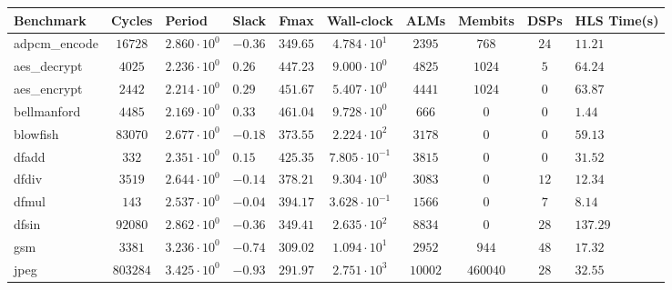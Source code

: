 \begin{tabular}{|l|c|HHc|c|c|c|cH|}
\hline
Benchmark     & Cycles       & Period                 & Slack     & Fmax       & Wall-clock              & ALMs      & Membits    & DSPs    & HLS Time(s) \\
\hline
adpcm\_encode & $ 16728    $ & $ 2.860 \cdot 10^{0} $ & $ -0.36 $ & $ 349.65 $ & $ 4.784 \cdot 10^{1}  $ & $ 2395  $ & $ 768    $ & $ 24  $ & $ 11.21   $ \\
aes\_decrypt  & $ 4025     $ & $ 2.236 \cdot 10^{0} $ & $ 0.26  $ & $ 447.23 $ & $ 9.000 \cdot 10^{0}  $ & $ 4825  $ & $ 1024   $ & $ 5   $ & $ 64.24   $ \\
aes\_encrypt  & $ 2442     $ & $ 2.214 \cdot 10^{0} $ & $ 0.29  $ & $ 451.67 $ & $ 5.407 \cdot 10^{0}  $ & $ 4441  $ & $ 1024   $ & $ 0   $ & $ 63.87   $ \\
bellmanford   & $ 4485     $ & $ 2.169 \cdot 10^{0} $ & $ 0.33  $ & $ 461.04 $ & $ 9.728 \cdot 10^{0}  $ & $ 666   $ & $ 0      $ & $ 0   $ & $ 1.44    $ \\
blowfish      & $ 83070    $ & $ 2.677 \cdot 10^{0} $ & $ -0.18 $ & $ 373.55 $ & $ 2.224 \cdot 10^{2}  $ & $ 3178  $ & $ 0      $ & $ 0   $ & $ 59.13   $ \\
dfadd         & $ 332      $ & $ 2.351 \cdot 10^{0} $ & $ 0.15  $ & $ 425.35 $ & $ 7.805 \cdot 10^{-1} $ & $ 3815  $ & $ 0      $ & $ 0   $ & $ 31.52   $ \\
dfdiv         & $ 3519     $ & $ 2.644 \cdot 10^{0} $ & $ -0.14 $ & $ 378.21 $ & $ 9.304 \cdot 10^{0}  $ & $ 3083  $ & $ 0      $ & $ 12  $ & $ 12.34   $ \\
dfmul         & $ 143      $ & $ 2.537 \cdot 10^{0} $ & $ -0.04 $ & $ 394.17 $ & $ 3.628 \cdot 10^{-1} $ & $ 1566  $ & $ 0      $ & $ 7   $ & $ 8.14    $ \\
dfsin         & $ 92080    $ & $ 2.862 \cdot 10^{0} $ & $ -0.36 $ & $ 349.41 $ & $ 2.635 \cdot 10^{2}  $ & $ 8834  $ & $ 0      $ & $ 28  $ & $ 137.29  $ \\
gsm           & $ 3381     $ & $ 3.236 \cdot 10^{0} $ & $ -0.74 $ & $ 309.02 $ & $ 1.094 \cdot 10^{1}  $ & $ 2952  $ & $ 944    $ & $ 48  $ & $ 17.32   $ \\
jpeg          & $ 803284   $ & $ 3.425 \cdot 10^{0} $ & $ -0.93 $ & $ 291.97 $ & $ 2.751 \cdot 10^{3}  $ & $ 10002 $ & $ 460040 $ & $ 28  $ & $ 32.55   $ \\

\end{tabular}
